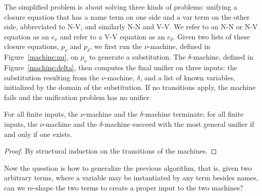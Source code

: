 \documentclass[a4paper,UKenglish]{lipics-v2016}
\newcommand*{\transname}[1]{\textsc{#1}}
\begin{document}
The simplified problem is about solving three kinds of problems:
unifying a closure equation that has a name term on one side
and a var term on the other side,
abbreviated to \transname{N-V},
and similarly \transname{N-N} and \transname{V-V}.
We refer to an \transname{N-N} or \transname{N-V} equation as
an \emph{$e_\nu$} and refer to a
\transname{V-V} equation as an \emph{$e_\delta$}.
Given two lists of these closure equations,
$p_\nu$ and $p_\delta$,
we first run the
$\nu$-machine, defined in Figure~\ref{machine:nu},
on $p_\nu$ to generate a substitution.
The $\delta$-machine, defined in Figure~\ref{machine:delta},
then computes the final unifier on three inputs:
the substitution resulting from the $\nu$-machine,
$\delta$, and a list of known variables, initialized by
the domain of the substitution.
If no transitions apply, the machine
fails and the unification problem has no unifier.


\begin{lemma}\label{lemma:numachine}
 For all finite inputs, the $\nu$-machine and the $\delta$-machine terminate;
 for all finite inputs, the $\nu$-machine and the $\delta$-machine
 succeed with the most general unifier if and only if one exists.
\end{lemma}
\begin{proof}
By structural induction on the transitions of the machines.
\end{proof}


Now the question is how to generalize the previous algorithm, that is,
given two arbitrary terms, where a variable may be instantiated by any
term besides names, can we re-shape the two terms to create a proper
input to the two machines?
\end{document}
